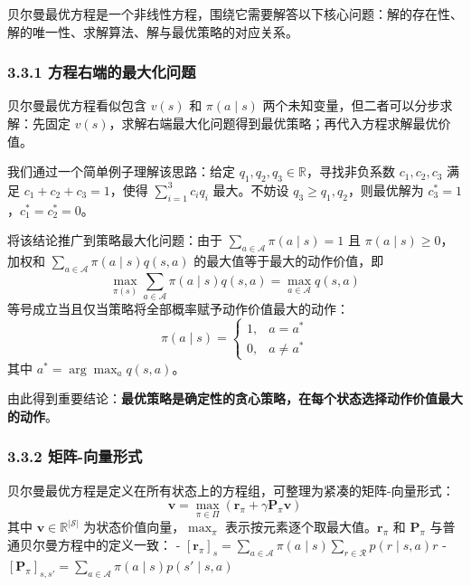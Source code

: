 \documentclass[UTF8]{article}
\begin{document}
贝尔曼最优方程是一个非线性方程，围绕它需要解答以下核心问题：解的存在性、解的唯一性、求解算法、解与最优策略的对应关系。

\subsubsection*{3.3.1 方程右端的最大化问题}

贝尔曼最优方程看似包含 $v(s)$ 和 $\pi(a \mid s)$ 两个未知变量，但二者可以分步求解：先固定 $v(s)$，求解右端最大化问题得到最优策略；再代入方程求解最优价值。

我们通过一个简单例子理解该思路：给定 $q_1, q_2, q_3 \in \mathbb{R}$，寻找非负系数 $c_1, c_2, c_3$ 满足 $c_1+c_2+c_3=1$，使得 $\sum_{i=1}^3 c_i q_i$ 最大。不妨设 $q_3 \geq q_1, q_2$，则最优解为 $c_3^*=1$，$c_1^*=c_2^*=0$。

将该结论推广到策略最大化问题：由于 $\sum_{a \in \mathcal{A}} \pi(a \mid s) = 1$ 且 $\pi(a \mid s) \geq 0$，加权和 $\sum_{a \in \mathcal{A}} \pi(a \mid s) q(s, a)$ 的最大值等于最大的动作价值，即
\[
\max_{\pi(s)} \sum_{a \in \mathcal{A}} \pi(a \mid s) q(s, a) = \max_{a \in \mathcal{A}} q(s, a)
\]
等号成立当且仅当策略将全部概率赋予动作价值最大的动作：
\[
\pi(a \mid s) =
\begin{cases}
1, & a = a^* \\
0, & a \neq a^*
\end{cases}
\]
其中 $a^* = \arg\max_{a} q(s, a)$。

由此得到重要结论：\textbf{最优策略是确定性的贪心策略，在每个状态选择动作价值最大的动作}。

\subsubsection*{3.3.2 矩阵-向量形式}

贝尔曼最优方程是定义在所有状态上的方程组，可整理为紧凑的矩阵-向量形式：
\begin{equation}
\label{eq:boe_matrix}
\boldsymbol{v} = \max_{\pi \in \Pi} \left( \boldsymbol{r}_\pi + \gamma \boldsymbol{P}_\pi \boldsymbol{v} \right)
\end{equation}
其中 $\boldsymbol{v} \in \mathbb{R}^{|\mathcal{S}|}$ 为状态价值向量，$\max_\pi$ 表示按元素逐个取最大值。$\boldsymbol{r}_\pi$ 和 $\boldsymbol{P}_\pi$ 与普通贝尔曼方程中的定义一致：
- $[\boldsymbol{r}_\pi]_s = \sum_{a \in \mathcal{A}} \pi(a \mid s) \sum_{r \in \mathcal{R}} p(r \mid s, a) r$
- $[\boldsymbol{P}_\pi]_{s,s'} = \sum_{a \in \mathcal{A}} \pi(a \mid s) p(s' \mid s, a)$
\end{document}
